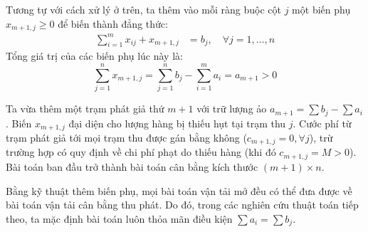 \documentclass[../main.tex]{subfiles}
\begin{document}
Tương tự với cách xử lý ở trên, ta thêm vào mỗi ràng buộc cột $j$ một biến phụ $x_{m+1, j} \ge 0$ để biến thành đẳng thức:
\begin{align*}
    \sum_{i=1}^{m} x_{ij} + x_{m+1, j} &= b_j, \quad \forall j = 1, \dots, n
\end{align*}
Tổng giá trị của các biến phụ lúc này là:
\[ \sum_{j=1}^{n} x_{m+1, j} = \sum_{j=1}^{n} b_j - \sum_{i=1}^{m} a_i = a_{m+1} > 0 \]

Ta vừa thêm một trạm phát giả thứ $m+1$ với trữ lượng ảo $a_{m+1} = \sum b_j - \sum a_i$. Biến $x_{m+1, j}$ đại diện cho lượng hàng bị thiếu hụt tại trạm thu $j$. Cước phí từ trạm phát giả tới mọi trạm thu được gán bằng không ($c_{m+1, j} = 0, \forall j$), trừ trường hợp có quy định về chi phí phạt do thiếu hàng (khi đó $c_{m+1, j} = M > 0$). Bài toán ban đầu trở thành bài toán cân bằng kích thước $(m+1) \times n$.

\vspace{0.5cm}
\begin{conclusion}
Bằng kỹ thuật thêm biến phụ, mọi bài toán vận tải mở đều có thể đưa được về bài toán vận tải cân bằng thu phát. Do đó, trong các nghiên cứu thuật toán tiếp theo, ta mặc định bài toán luôn thỏa mãn điều kiện $\sum a_i = \sum b_j$.
\end{conclusion}
\end{document}
